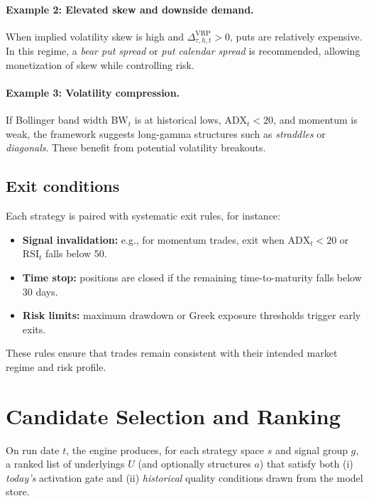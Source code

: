 \documentclass[12pt,a4paper]{report}
\begin{document}
\paragraph{Example 2: Elevated skew and downside demand.}
When implied volatility skew is high and $\Delta^{\text{VRP}}_{\tau,h,t}>0$, puts are relatively expensive. In this regime, a \emph{bear put spread} or \emph{put calendar spread} is recommended, allowing monetization of skew while controlling risk.

\paragraph{Example 3: Volatility compression.}
If Bollinger band width $\text{BW}_t$ is at historical lows, $\text{ADX}_t<20$, and momentum is weak, the framework suggests long-gamma structures such as \emph{straddles} or \emph{diagonals}. These benefit from potential volatility breakouts.

\subsection{Exit conditions}

Each strategy is paired with systematic exit rules, for instance:
\begin{itemize}
    \item \textbf{Signal invalidation:} e.g., for momentum trades, exit when $\text{ADX}_t<20$ or $\text{RSI}_t$ falls below 50.
    \item \textbf{Time stop:} positions are closed if the remaining time-to-maturity falls below 30 days.
    \item \textbf{Risk limits:} maximum drawdown or Greek exposure thresholds trigger early exits.
\end{itemize}

These rules ensure that trades remain consistent with their intended market regime and risk profile.



\section{Candidate Selection and Ranking}
\label{sec:selection_ranking}

On run date $t$, the engine produces, for each strategy space $s$ and signal group $g$, a ranked list of underlyings $U$ (and optionally structures $a$) that satisfy both (i) \emph{today's} activation gate and (ii) \emph{historical} quality conditions drawn from the model store.
\end{document}
